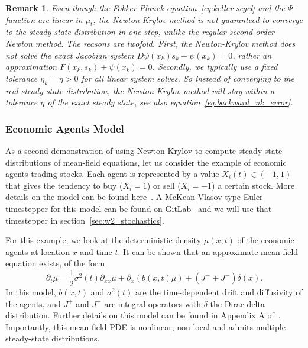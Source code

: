 \documentclass{article}
\newtheorem{remark}{Remark}
\begin{document}
\begin{remark}
Even though the Fokker-Planck equation~\eqref{eq:keller-segel} and the $\Psi$-function are linear in $\mu_t$, the Newton-Krylov method is not guaranteed to converge to the steady-state distribution in one step, unlike the regular second-order Newton method. The reasons are twofold. First, the Newton-Krylov method does not solve the exact Jacobian system $D \psi(x_k) s_k + \psi(x_k) = 0$, rather an approximation $F(x_k, s_k) + \psi(x_k) = 0$. Secondly, we typically use a fixed tolerance $\eta_k = \eta > 0$ for all linear system solves. So instead of converging to the real steady-state distribution, the Newton-Krylov method will stay within a tolerance $\eta$ of the exact steady state, see also equation~\eqref{eq:backward_nk_error}.
\end{remark}

\subsubsection{Economic Agents Model} \label{subsusbec:agentmodel}
As a second demonstration of using Newton-Krylov to compute steady-state distributions of mean-field equations, let us consider the example of economic agents trading stocks. Each agent is represented by a value $X_i(t) \in (-1,1)$ that gives the tendency to buy ($X_i =1$) or sell ($X_i = -1$) a certain stock. More details on the model can be found here~\cite{fabiani2024task}. A McKean-Vlasov-type Euler timestepper for this model can be found on GitLab~\cite{} and we will use that timestepper in section~\ref{sec:w2_stochastics}. 

For this example, we look at the deterministic density $\mu(x,t)$ of the economic agents at location $x$ and time $t$. It can be shown that an approximate mean-field equation exists, of the form
\begin{equation} \label{eq:meanfield_agents}
    \partial_t \mu = \frac{1}{2} \sigma^2(t) \partial_{xx} \mu + \partial_x\left(b(x,t) \mu\right) + \left(J^+ + J^-\right) \delta(x).
\end{equation}
In this model, $b(x,t)$ and $\sigma^2(t)$ are the time-dependent drift and diffusivity of the agents, and $J^+$ and $J^-$ are integral operators with $\delta$ the Dirac-delta distribution. Further details on this model can be found in Appendix A of~\cite{fabiani2024task}. Importantly, this mean-field PDE is nonlinear, non-local and admits multiple steady-state distributions. 
\end{document}
